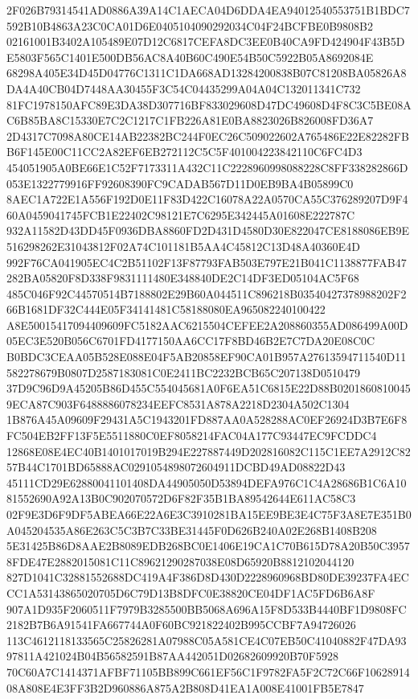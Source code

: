 \documentclass[UTF8,fontset=fandol,zihao=-4,a4paper]{ctexart}
\begin{document}
{{2F026B79314541AD0886A39A14C1AECA04D6DDA4EA94012540553751B1BDC7592B10B4863A23C0CA01D6E0405104090292034C04F24BCFBE0B9808B2
02161001B3402A105489E07D12C6817CEFA8DC3EE0B40CA9FD424904F43B5DE5803F565C1401E500DB56AC8A40B60C490E54B50C5922B05A8692084E
68298A405E34D45D04776C1311C1DA668AD13284200838B07C81208BA05826A8DA4A40CB04D7448AA30455F3C54C04435299A04A04C132011341C732
81FC1978150AFC89E3DA38D307716BF833029608D47DC49608D4F8C3C5BE08AC6B85BA8C15330E7C2C1217C1FB226A81E0BA8823026B826008FD36A7
2D4317C7098A80CE14AB22382BC244F0EC26C509022602A765486E22E82282FBB6F145E00C11CC2A82EF6EB272112C5C5F401004223842110C6FC4D3
454051905A0BE66E1C52F7173311A432C11C2228960998088228C8FF338282866D053E1322779916FF92608390FC9CADAB567D11D0EB9BA4B05899C0
8AEC1A722E1A556F192D0E11F83D422C16078A22A0570CA55C376289207D9F460A0459041745FCB1E22402C98121E7C6295E342445A01608E222787C
932A11582D43DD45F0936DBA8860FD2D431D4580D30E822047CE8188086EB9E516298262E31043812F02A74C101181B5AA4C45812C13D48A40360E4D
992F76CA041905EC4C2B51102F13F87793FAB503E797E21B041C1138877FAB47282BA05820F8D338F9831111480E348840DE2C14DF3ED05104AC5F68
485C046F92C44570514B7188802E29B60A044511C896218B03540427378988202F266B1681DF32C444E05F34141481C58188080EA965082240100422
A8E50015417094409609FC5182AAC6215504CEFEE2A208860355AD086499A00D05EC3E520B056C6701FD4177150AA6CC17F8BD46B2E7C7DA20E08C0C
B0BDC3CEAA05B528E088E04F5AB20858EF90CA01B957A27613594711540D11582278679B0807D2587183081C0E2411BC2232BCB65C207138D0510479
37D9C96D9A45205B86D455C554045681A0F6EA51C6815E22D88B02018608100459ECA87C903F6488886078234EEFC8531A878A2218D2304A502C1304
1B876A45A09609F29431A5C1943201FD887AA0A528288AC0EF26924D3B7E6F8FC504EB2FF13F5E5511880C0EF8058214FAC04A177C93447EC9FCDDC4
12868E08E4EC40B1401017019B294E227887449D202816082C115C1EE7A2912C8257B44C1701BD65888AC0291054898072604911DCBD49AD08822D43
45111CD29E62880041101408DA44905050D53894DEFA976C1C4A28686B1C6A1081552690A92A13B0C902070572D6F82F35B1BA89542644E611AC58C3
02F9E3D6F9DF5ABEA66E22A6E3C3910281BA15EE9BE3E4C75F3A8E7E351B0A045204535A86E263C5C3B7C33BE31445F0D626B240A02E268B1408B208
5E31425B86D8AAE2B8089EDB268BC0E1406E19CA1C70B615D78A20B50C39578FDE47E2882015081C11C89621290287038E08D65920B8812102044120
827D1041C32881552688DC419A4F386D8D430D2228960968BD80DE39237FA4ECCC1A53143865020705D6C79D13B8DFC0E38820CE04DF1AC5FD6B6A8F
907A1D935F2060511F7979B3285500BB5068A696A15F8D533B4440BF1D9808FC2182B7B6A91541FA667744A0F60BC921822402B995CCBF7A94726026
113C4612118133565C25826281A07988C05A581CE4C07EB50C41040882F47DA9397811A421024B04B56582591B87AA442051D02682609920B70F5928
70C60A7C1414371AFBF71105BB899C661EF56C1F9782FA5F2C72C66F1062891408A808E4E3FF3B2D960886A875A2B808D41EA1A008E41001FB5E7847
}}
\end{document}
